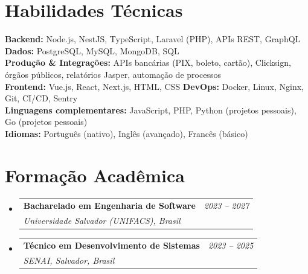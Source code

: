 \documentclass[a4paper,9pt]{article}
\makeatletter
\newcommand{\resumeSubheading}[4]{
\vspace{0.3mm}\item
    \begin{tabular*}{0.98\textwidth}[t]{l@{\extracolsep{\fill}}r}
        \textbf{#1} & \textit{\footnotesize{#4}} \\
        \textit{\footnotesize{#3}} &  \footnotesize{#2}\\
    \end{tabular*}
    \vspace{-2mm}
}
\newcommand{\resumeSubHeadingListStart}{\begin{itemize}[leftmargin=*,labelsep=0mm]}
\newcommand{\resumeSubHeadingListEnd}{\end{itemize}\vspace{1mm}}
\makeatother
\begin{document}
\section{\textbf{Habilidades Técnicas}}
\vspace{0.5mm}
\small{
\textbf{Backend:} Node.js, NestJS, TypeScript, Laravel (PHP), APIs REST, GraphQL \hspace{3mm}
\textbf{Dados:} PostgreSQL, MySQL, MongoDB, SQL \\
\textbf{Produção \& Integrações:} APIs bancárias (PIX, boleto, cartão), Clicksign, órgãos públicos, relatórios Jasper, automação de processos \\
\textbf{Frontend:} Vue.js, React, Next.js, HTML, CSS \hspace{3mm}
\textbf{DevOps:} Docker, Linux, Nginx, Git, CI/CD, Sentry \\
\textbf{Linguagens complementares:} JavaScript, PHP, Python (projetos pessoais), Go (projetos pessoais) \\
\textbf{Idiomas:} Português (nativo), Inglês (avançado), Francês (básico)
}
\vspace{-2mm}
\section{\textbf{Formação Acadêmica}}
  \resumeSubHeadingListStart
    \resumeSubheading
      {Bacharelado em Engenharia de Software}{}
      {Universidade Salvador (UNIFACS), Brasil}{2023 -- 2027}

    \resumeSubheading
      {Técnico em Desenvolvimento de Sistemas}{}
      {SENAI, Salvador, Brasil}{2023 -- 2025}
  \resumeSubHeadingListEnd
\vspace{-3mm}
\end{document}
